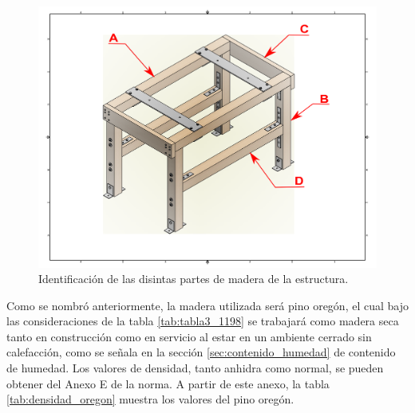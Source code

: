 \begin{figure}[h]
\centering
\includegraphics[width=1\linewidth, trim={10cm 5cm 7cm 3cm},clip]{Imagenes/mesa_iso.png}
\caption{Identificación de las disintas partes de madera de la estructura.}
\label{fig:mesa_iso}
\end{figure}

Como se nombró anteriormente, la madera utilizada será pino oregón, el cual bajo las consideraciones de la tabla \ref{tab:tabla3_1198} se trabajará como madera seca tanto en construcción como en servicio al estar en un ambiente cerrado sin calefacción, como se señala en la sección \ref{sec:contenido_humedad} de contenido de humedad. Los valores de densidad, tanto anhidra como normal, se pueden obtener del Anexo E de la norma. A partir de este anexo, la tabla \ref{tab:densidad_oregon} muestra los valores del pino oregón.


